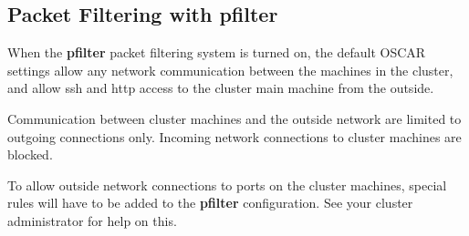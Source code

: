 %
% 
% 
% 
% 
%

\subsection{Packet Filtering with pfilter}
\label{app:pfilter-overview}

When the {\bf pfilter} packet filtering system is turned on, the
default OSCAR settings allow any network communication between the
machines in the cluster, and allow ssh and http access to the cluster
main machine from the outside.

Communication between cluster machines and the outside network are
limited to outgoing connections only.  Incoming network connections to
cluster machines are blocked.

To allow outside network connections to ports on the cluster machines,
special rules will have to be added to the {\bf pfilter}
configuration.  See your cluster administrator for help on this.
